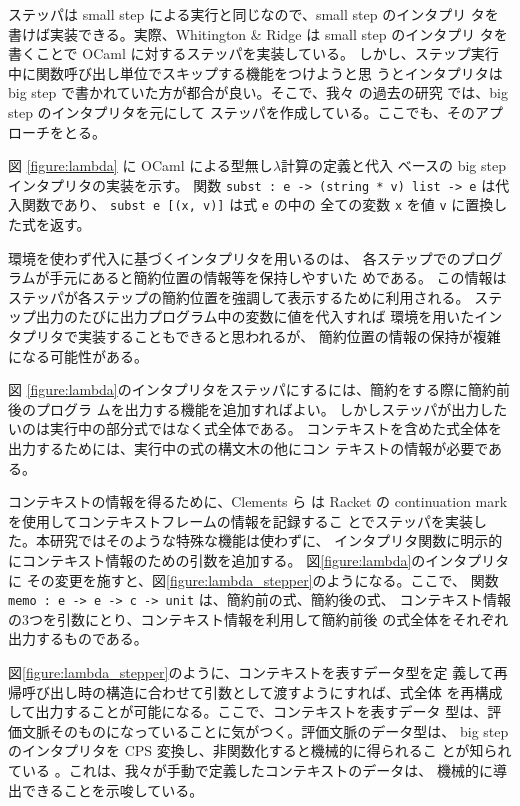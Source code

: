 ステッパは small step による実行と同じなので、small step のインタプリ
タを書けば実装できる。実際、Whitington \& Ridge \cite{EPTCS294.3} は small step のインタプリ
タを書くことで OCaml に対するステッパを実装している。
しかし、ステップ実行中に関数呼び出し単位でスキップする機能をつけようと思
うとインタプリタは big step で書かれていた方が都合が良い。そこで、我々
の過去の研究 \cite{FCA19} では、big step のインタプリタを元にして
ステッパを作成している。ここでも、そのアプローチをとる。

図 \ref{figure:lambda} に OCaml による型無し$\lambda$計算の定義と代入
ベースの big step インタプリタの実装を示す。
関数 \texttt{subst :\ e -> (string * v) list -> e} は代入関数であり、
\texttt{subst e [(x, v)]} は式 \texttt{e} の中の
全ての変数 \texttt{x} を値 \texttt{v} に置換した式を返す。

環境を使わず代入に基づくインタプリタを用いるのは、
各ステップでのプログラムが手元にあると簡約位置の情報等を保持しやすいた
めである。
この情報はステッパが各ステップの簡約位置を強調して表示するために利用される。
ステップ出力のたびに出力プログラム中の変数に値を代入すれば
環境を用いたインタプリタで実装することもできると思われるが、
簡約位置の情報の保持が複雑になる可能性がある。



図 \ref{figure:lambda}のインタプリタをステッパにするには、簡約をする際に簡約前後のプログラ
ムを出力する機能を追加すればよい。
しかしステッパが出力したいのは実行中の部分式ではなく式全体である。
コンテキストを含めた式全体を出力するためには、実行中の式の構文木の他にコン
テキストの情報が必要である。

コンテキストの情報を得るために、Clements ら\cite{clements01} は Racket
の continuation mark を使用してコンテキストフレームの情報を記録するこ
とでステッパを実装した。本研究ではそのような特殊な機能は使わずに、
インタプリタ関数に明示的にコンテキスト情報のための引数を追加する。
図\ref{figure:lambda}のインタプリタに
その変更を施すと、図\ref{figure:lambda_stepper}のようになる。ここで、
関数 \texttt{memo :\ e -> e -> c -> unit} は、簡約前の式、簡約後の式、
コンテキスト情報の3つを引数にとり、コンテキスト情報を利用して簡約前後
の式全体をそれぞれ出力するものである。

図\ref{figure:lambda_stepper}のように、コンテキストを表すデータ型を定
義して再帰呼び出し時の構造に合わせて引数として渡すようにすれば、式全体
を再構成して出力することが可能になる。ここで、コンテキストを表すデータ
型は、評価文脈そのものになっていることに気がつく。評価文脈のデータ型は、
big step のインタプリタを CPS 変換し、非関数化すると機械的に得られるこ
とが知られている \cite{AK2010, 10.1145/1411204.1411206}。これは、我々が手動で定義したコンテキストのデータは、
機械的に導出できることを示唆している。

